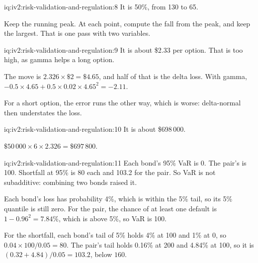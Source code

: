 \begin{solution}{iq:iv2:risk-validation-and-regulation:8}
It is 50\%, from 130 to 65.

Keep the running peak. At each point, compute the fall from the peak, and keep the largest. That is one pass with two variables.

\end{solution}

\begin{solution}{iq:iv2:risk-validation-and-regulation:9}
It is about \$2.33 per option. That is too high, as gamma helps a long option.

The move is $2.326 \times \$2 = \$4.65$, and half of that is the delta loss. With gamma, $-0.5 \times 4.65 + 0.5 \times 0.02 \times 4.65^2 = -2.11$.

For a short option, the error runs the other way, which is worse: delta-normal then understates the loss.

\end{solution}

\begin{solution}{iq:iv2:risk-validation-and-regulation:10}
It is about \$698\,000.

$\$50\,000 \times 6 \times 2.326 = \$697\,800$.

\end{solution}

\begin{solution}{iq:iv2:risk-validation-and-regulation:11}
Each bond's 95\% VaR is 0. The pair's is 100. Shortfall at 95\% is 80 each and 103.2 for the pair. So VaR is not subadditive: combining two bonds raised it.

Each bond's loss has probability 4\%, which is within the 5\% tail, so its 5\% quantile is still zero. For the pair, the chance of at least one default is $1 - 0.96^2 = 7.84\%$, which is above 5\%, so VaR is 100.

For the shortfall, each bond's tail of 5\% holds 4\% at 100 and 1\% at 0, so $0.04 \times 100/0.05 = 80$. The pair's tail holds 0.16\% at 200 and 4.84\% at 100, so it is $(0.32 + 4.84)/0.05 = 103.2$, below $160$.

\end{solution}

